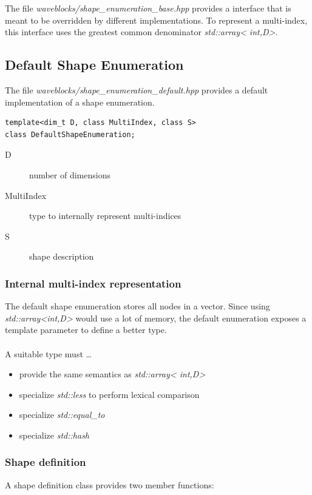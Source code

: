 \documentclass{article}
\begin{document}
The file \emph{waveblocks/shape\_enumeration\_base.hpp} provides a
interface that is meant to be overridden by different
implementations. To represent a multi-index, this interface uses the
greatest common denominator \emph{std::array\textless
  int,D\textgreater}.

\subsection{Default Shape Enumeration}

The file \emph{waveblocks/shape\_enumeration\_default.hpp} provides a
default implementation of a shape enumeration.

\begin{verbatim}
template<dim_t D, class MultiIndex, class S>
class DefaultShapeEnumeration;
\end{verbatim}

\begin{description}
\item[D] number of dimensions
\item[MultiIndex] type to internally represent multi-indices
\item[S] shape description
\end{description}

\subsubsection{Internal multi-index representation}
The default shape enumeration stores all nodes in a vector. Since
using \emph{std::array\textless int,D\textgreater} would use a lot of
memory, the default enumeration exposes a template parameter to define
a better type. \\ \\ A suitable type must \dots
\begin{itemize}
\item provide the same semantics as \emph{std::array\textless
    int,D\textgreater}
\item specialize \emph{std::less} to perform lexical comparison
\item specialize \emph{std::equal\_to}
\item specialize \emph{std::hash}
\end{itemize}

\subsubsection{Shape definition}
A shape definition class provides two member functions:
\end{document}
